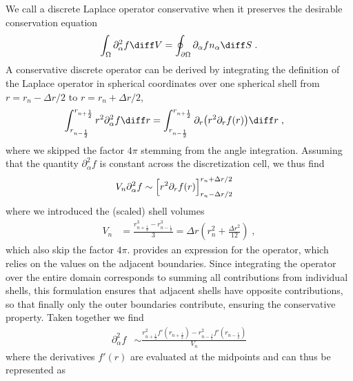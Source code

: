 \documentclass[
	superscriptaddress,
	twocolumn,
	aps, pre
]{revtex4-1}
\newcommand{\dr}{\Delta r}
\begin{document}
We call a discrete Laplace operator conservative when it preserves the desirable conservation equation
\begin{align}
	\int_\Omega \partial_\alpha^2 f \diff V
		= \oint_{\partial\Omega} \partial_\alpha f n_\alpha \diff S
	\;.
\end{align}
A conservative discrete operator can be derived by integrating the definition of the Laplace operator in spherical coordinates over one spherical shell from $r=r_n - \dr/2$ to $r=r_n  + \dr/2$,
\begin{align}
	\int_{r_{n - \frac12}}^{r_{n + \frac12}} r^2 \partial_\alpha^2 f \diff r
		&= \int_{r_{n - \frac12}}^{r_{n + \frac12}} \partial_r\bigl(r^2 \partial_r f(r)\bigr) \diff r
	\;,
\end{align}
where we skipped the factor $4\pi$ stemming from the angle integration.
Assuming that the quantity $\partial_\alpha^2 f$ is constant across the discretization cell, we thus find
\begin{align}
	V_n \partial_\alpha^2 f %
		&\sim \Bigl[r^2 \partial_r f(r)\Bigr]_{r_n - \dr/2}^{r_n + \dr/2}
	\label{eqn:spherical_laplace_conservative_relation}
\end{align}
where we introduced the (scaled) shell volumes
\begin{align}
	V_n &= \frac{r_{n + \frac12}^3 - r_{n - \frac12}^3}{3}
	= \dr \left(	r_n^2 + \frac{\dr^2}{12} \right)
	\label{eqn:spherical_shell_volume}
\;,
\end{align}
which also skip the factor $4\pi$.
 provides an expression for the operator, which relies on the values on the adjacent boundaries.
Since integrating the operator over the entire domain corresponds to summing all contributions from individual shells, this formulation ensures that adjacent shells have opposite contributions, so that finally only the outer boundaries contribute, ensuring the conservative property.
Taken together we find
\begin{align}
	\partial_\alpha^2 f
		&\sim \frac{r_{n+\frac12}^2 f'\left(r_{n+\frac12}\right) - r_{n-\frac12}^2 f'\left(r_{n-\frac12}\right)}{V_n}
\end{align}
where the derivatives $f'(r)$ are evaluated at the midpoints and can thus be represented as
\end{document}
